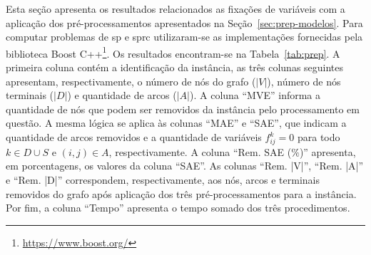Esta seção apresenta  os resultados relacionados as fixações de  variáveis com a
aplicação dos  pré-processamentos apresentados  na Seção~\ref{sec:prep-modelos}.
Para computar problemas de \gls{sp} e \gls{sprc} utilizaram-se as implementações
fornecidas pela biblioteca  Boost C++\footnote{\url{https://www.boost.org/}}. Os
resultados  encontram-se na  Tabela~\ref{tab:prep}. A  primeira coluna  contém a
identificação   da   instância,   as    três   colunas   seguintes   apresentam,
respectivamente,  o número  de nós  do grafo  ($|V|$), número  de nós  terminais
($|D|$) e quantidade de arcos ($|A|$).  A coluna ``MVE'' informa a quantidade de
nós que podem ser removidos da  instância pelo processamento em questão. A mesma
lógica se aplica às colunas ``MAE'' e ``SAE'', que indicam a quantidade de arcos
removidos e a quantidade  de variáveis $f_{ij}^{k} = 0$ para todo  $k \in D \cup
S$ e $(i, j) \in A$, respectivamente. A coluna ``Rem. SAE ($\%$)'' apresenta, em
porcentagens,  os valores  da coluna  ``SAE''. As  colunas ``Rem.  |V|'', ``Rem.
|A|'' e ``Rem.  |D|'' correspondem, respectivamente, aos nós,  arcos e terminais
removidos do grafo após aplicação  dos três pré-processamentos para a instância.
Por fim, a coluna ``Tempo'' apresenta o tempo somado dos três procedimentos.
\newpage

